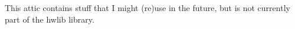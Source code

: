 This attic contains stuff that I might (re)use in the future, but is not currently part of the hwlib library. 